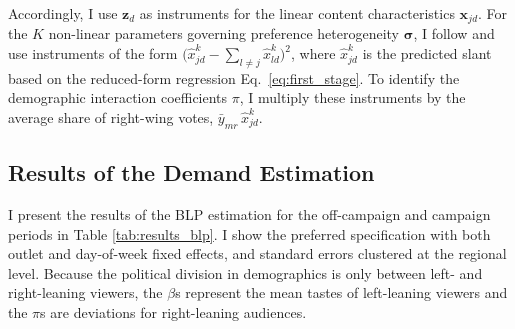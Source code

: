 \documentclass[12pt]{article}
\begin{document}
Accordingly, I use
$\bm{z}_{d}$
as instruments for the linear content characteristics $ \bm{x}_{jd}$.  For the $K$ non-linear parameters governing preference heterogeneity $ \bm{\sigma}$, I follow \citet{gandhi2019measuring} and use instruments of the form 
$\bigl(\hat{x}_{jd}^k-\sum_{l\neq j}\hat{x}_{ld}^k\bigr)^2$,
where $\hat{x}_{jd}^k$ is the predicted slant based on the reduced-form regression Eq.~\eqref{eq:first_stage}. 	To identify the demographic interaction coefficients $\pi$, I multiply these instruments by the average share of right-wing votes, $\bar y_{mr}\,\hat{x}_{jd}^k$.



\subsection{Results of the Demand Estimation}

\label{sec:results}


I present the results of the BLP estimation for the off-campaign and campaign periods in Table \ref{tab:results_blp}. I show the preferred specification with both outlet and day-of-week fixed effects, and standard errors clustered at the regional level. Because the political division in demographics is only between left- and right-leaning viewers, the \(\beta\)s represent the mean tastes of left-leaning viewers and the \(\pi\)s are deviations for right-leaning audiences.
\end{document}
